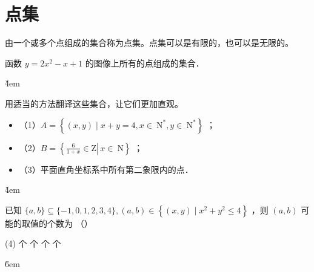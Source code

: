 \section{点集}

\begin{definition}[点集]
    由一个或多个点组成的集合称为点集。点集可以是有限的，也可以是无限的。
\end{definition}

\begin{example}
    函数 $y=2 x^2-x+1$ 的图像上所有的点组成的集合．
\end{example}

\v{4em}

\begin{example}
    用适当的方法翻译这些集合，让它们更加直观。
    \begin{itemize}
        \item （1）$A=\left\{(x, y) \mid x+y=4, x \in \mathrm{~N}^*, y \in \mathrm{~N}^*\right\}$ ；
        \item （2）$B=\left\{\left.\frac{6}{1+x} \in \mathrm{Z} \right\rvert\, x \in \mathrm{~N}\right\}$ ；
        \item （3）平面直角坐标系中所有第二象限内的点．
    \end{itemize}
\end{example}

\v{4em}

\begin{example}
    已知 $\{a, b\} \subseteq\{-1,0,1,2,3,4\},(a, b) \in\left\{(x, y) \mid x^2+y^2 \leq 4\right\}$ ，则 $(a, b)$ 可能的取值的个数为 （\qquad）
    \begin{tasks}(4)
         个
         个
         个
         个
    \end{tasks}
\end{example}

\v{6em}
